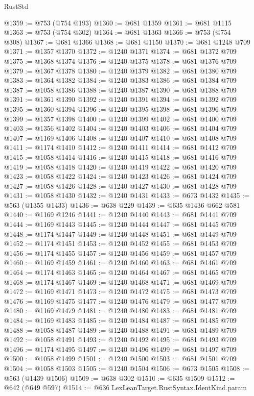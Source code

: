 \begin{lexlean}{RustStd}
\begin{coremodule}
@1359 := @753 (@754 @193)
@1360 := @681 @1359
@1361 := @681 @1115
@1363 := @753 (@754 @302)
@1364 := @681 @1363
@1366 := @753 (@754 @308)
@1367 := @681 @1366
@1368 := @681 @1150
@1370 := @681 @1248 @709
@1371 := @1357 @1370
@1372 := @1240 @1371
@1374 := @681 @1372 @709
@1375 := @1368 @1374
@1376 := @1240 @1375
@1378 := @681 @1376 @709
@1379 := @1367 @1378
@1380 := @1240 @1379
@1382 := @681 @1380 @709
@1383 := @1364 @1382
@1384 := @1240 @1383
@1386 := @681 @1384 @709
@1387 := @1058 @1386
@1388 := @1240 @1387
@1390 := @681 @1388 @709
@1391 := @1361 @1390
@1392 := @1240 @1391
@1394 := @681 @1392 @709
@1395 := @1360 @1394
@1396 := @1240 @1395
@1398 := @681 @1396 @709
@1399 := @1357 @1398
@1400 := @1240 @1399
@1402 := @681 @1400 @709
@1403 := @1356 @1402
@1404 := @1240 @1403
@1406 := @681 @1404 @709
@1407 := @1169 @1406
@1408 := @1240 @1407
@1410 := @681 @1408 @709
@1411 := @1174 @1410
@1412 := @1240 @1411
@1414 := @681 @1412 @709
@1415 := @1058 @1414
@1416 := @1240 @1415
@1418 := @681 @1416 @709
@1419 := @1058 @1418
@1420 := @1240 @1419
@1422 := @681 @1420 @709
@1423 := @1058 @1422
@1424 := @1240 @1423
@1426 := @681 @1424 @709
@1427 := @1058 @1426
@1428 := @1240 @1427
@1430 := @681 @1428 @709
@1431 := @1058 @1430
@1432 := @1240 @1431
@1433 := @673 @1432
@1435 := @563 (@1355 @1433)
@1436 := @638 @229
@1439 := @635 @1436 @662 @581
@1440 := @1169 @1246
@1441 := @1240 @1440
@1443 := @681 @1441 @709
@1444 := @1169 @1443
@1445 := @1240 @1444
@1447 := @681 @1445 @709
@1448 := @1174 @1447
@1449 := @1240 @1448
@1451 := @681 @1449 @709
@1452 := @1174 @1451
@1453 := @1240 @1452
@1455 := @681 @1453 @709
@1456 := @1174 @1455
@1457 := @1240 @1456
@1459 := @681 @1457 @709
@1460 := @1169 @1459
@1461 := @1240 @1460
@1463 := @681 @1461 @709
@1464 := @1174 @1463
@1465 := @1240 @1464
@1467 := @681 @1465 @709
@1468 := @1174 @1467
@1469 := @1240 @1468
@1471 := @681 @1469 @709
@1472 := @1169 @1471
@1473 := @1240 @1472
@1475 := @681 @1473 @709
@1476 := @1169 @1475
@1477 := @1240 @1476
@1479 := @681 @1477 @709
@1480 := @1169 @1479
@1481 := @1240 @1480
@1483 := @681 @1481 @709
@1484 := @1169 @1483
@1485 := @1240 @1484
@1487 := @681 @1485 @709
@1488 := @1058 @1487
@1489 := @1240 @1488
@1491 := @681 @1489 @709
@1492 := @1058 @1491
@1493 := @1240 @1492
@1495 := @681 @1493 @709
@1496 := @1174 @1495
@1497 := @1240 @1496
@1499 := @681 @1497 @709
@1500 := @1058 @1499
@1501 := @1240 @1500
@1503 := @681 @1501 @709
@1504 := @1058 @1503
@1505 := @1240 @1504
@1506 := @673 @1505
@1508 := @563 (@1439 @1506)
@1509 := @638 @302
@1510 := @635 @1509
@1512 := @642 (@649 @597)
@1514 := @636 LexLeanTarget.RustSyntax.IdentKind.param

\end{coremodule}
\end{lexlean}

